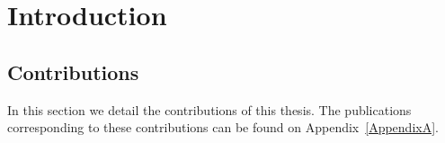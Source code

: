 
\chapter{Introduction} %
\label{Chapter1}


\section{Contributions}
In this section we detail the contributions of this thesis. The publications corresponding to these contributions can be found on Appendix~\ref{AppendixA}.
